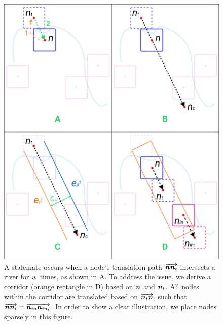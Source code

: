 {
\begin{figure}[tb!]
    \centering
    \includegraphics[width=\columnwidth]{figure/corridor.png}
    \caption{A stalemate occurs when a node's translation path $ \protect\overrightarrow{\bm{n}\bm{n}_t} $ intersects a river for $ w $ times, as shown in A. To address the issue, we derive a corridor (orange rectangle in D) based on $ \bm{n} $ and $ \bm{n}_t $. All nodes within the corridor are translated based on $ \protect\overrightarrow{\bm{n}_t\bm{n}} $, such that $ \protect\overrightarrow{\bm{n}\bm{n}_{t}} = \protect\overrightarrow{\bm{n}_{in}\bm{n}_{in_t}} $. In order to show a clear illustration, we place nodes sparsely in this figure.}
    \label{fig:corridor}
\end{figure}
}


